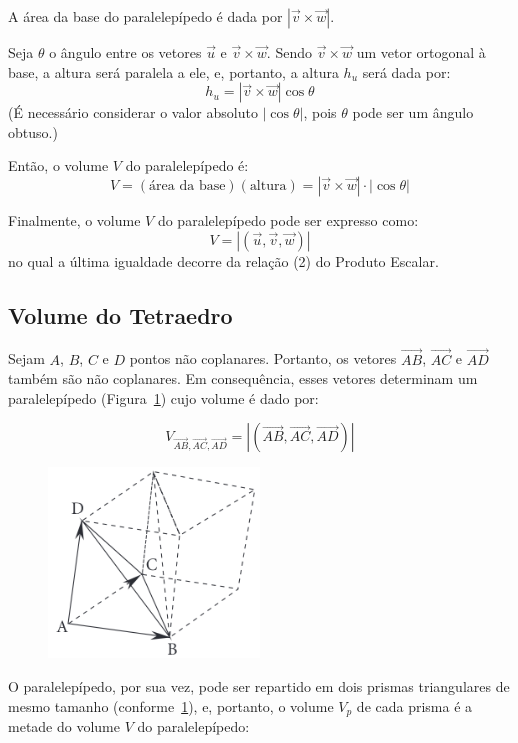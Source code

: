 A área da base do paralelepípedo é dada por $|\vec{v} \times \vec{w}|$.

Seja $\theta$ o ângulo entre os vetores $\vec{u}$ e $\vec{v} \times \vec{w}$.
Sendo $\vec{v} \times \vec{w}$ um vetor ortogonal à base, a altura será paralela
a ele, e, portanto, a altura $h_u$ será dada por:
\[
  h_u = |\vec{v} \times \vec{w}| \cos \theta
\]
(É necessário considerar o valor absoluto $|\cos \theta|$, pois $\theta$ pode
ser um ângulo obtuso.)

Então, o volume $V$ do paralelepípedo é:
\[
  V = (\text{área da base})(\text{altura}) = |\vec{v} \times \vec{w}| \cdot |\cos \theta|
\]

Finalmente, o volume $V$ do paralelepípedo pode ser expresso como:
\[
  V = |(\vec{u}, \vec{v}, \vec{w})|
\]
no qual a última igualdade decorre da relação (2) do Produto Escalar.

\newpage
\subsection{Volume do Tetraedro}

Sejam $A$, $B$, $C$ e $D$ pontos não coplanares. Portanto, os vetores
$\overrightarrow{AB}$, $\overrightarrow{AC}$ e $\overrightarrow{AD}$ também são
não coplanares. Em consequência, esses vetores determinam um paralelepípedo
(Figura~\ref{fig:fig4.4}) cujo volume é dado por:

\[
  V_{\overrightarrow{AB}, \overrightarrow{AC}, \overrightarrow{AD}} = |(\overrightarrow{AB}, \overrightarrow{AC}, \overrightarrow{AD})|
\]

\begin{figure}[H]
  \begin{center}
    \includegraphics[width=0.5\textwidth]{./fig/fig4.4.png}\label{fig:fig4.4}
  \end{center}
\end{figure}

O paralelepípedo, por sua vez, pode ser repartido em dois prismas triangulares
de mesmo tamanho (conforme~\ref{fig:fig4.4}), e, portanto, o volume $V_p$ de
cada prisma é a metade do volume $V$ do paralelepípedo:

